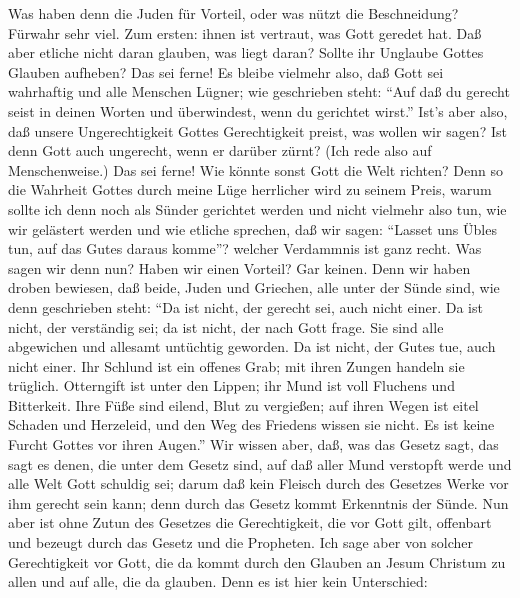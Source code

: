  Was haben denn die Juden für Vorteil, oder was nützt die
Beschneidung?  Fürwahr sehr viel. Zum ersten: ihnen ist
vertraut, was Gott geredet hat.  Daß aber etliche nicht
daran glauben, was liegt daran? Sollte ihr Unglaube Gottes Glauben
aufheben?  Das sei ferne! Es bleibe vielmehr also, daß Gott
sei wahrhaftig und alle Menschen Lügner; wie geschrieben steht: ``Auf
daß du gerecht seist in deinen Worten und überwindest, wenn du gerichtet
wirst.''  Ist's aber also, daß unsere Ungerechtigkeit Gottes
Gerechtigkeit preist, was wollen wir sagen? Ist denn Gott auch
ungerecht, wenn er darüber zürnt? (Ich rede also auf Menschenweise.)
 Das sei ferne! Wie könnte sonst Gott die Welt richten?
 Denn so die Wahrheit Gottes durch meine Lüge herrlicher
wird zu seinem Preis, warum sollte ich denn noch als Sünder gerichtet
werden  und nicht vielmehr also tun, wie wir gelästert
werden und wie etliche sprechen, daß wir sagen: ``Lasset uns Übles tun,
auf das Gutes daraus komme''? welcher Verdammnis ist ganz recht.
 Was sagen wir denn nun? Haben wir einen Vorteil? Gar
keinen. Denn wir haben droben bewiesen, daß beide, Juden und Griechen,
alle unter der Sünde sind,  wie denn geschrieben steht:
``Da ist nicht, der gerecht sei, auch nicht einer.  Da ist
nicht, der verständig sei; da ist nicht, der nach Gott frage.
 Sie sind alle abgewichen und allesamt untüchtig geworden.
Da ist nicht, der Gutes tue, auch nicht einer.  Ihr Schlund
ist ein offenes Grab; mit ihren Zungen handeln sie trüglich. Otterngift
ist unter den Lippen;  ihr Mund ist voll Fluchens und
Bitterkeit.  Ihre Füße sind eilend, Blut zu vergießen;
 auf ihren Wegen ist eitel Schaden und Herzeleid,
 und den Weg des Friedens wissen sie nicht. 
Es ist keine Furcht Gottes vor ihren Augen.''  Wir wissen
aber, daß, was das Gesetz sagt, das sagt es denen, die unter dem Gesetz
sind, auf daß aller Mund verstopft werde und alle Welt Gott schuldig
sei;  darum daß kein Fleisch durch des Gesetzes Werke vor
ihm gerecht sein kann; denn durch das Gesetz kommt Erkenntnis der Sünde.
 Nun aber ist ohne Zutun des Gesetzes die Gerechtigkeit,
die vor Gott gilt, offenbart und bezeugt durch das Gesetz und die
Propheten.  Ich sage aber von solcher Gerechtigkeit vor
Gott, die da kommt durch den Glauben an Jesum Christum zu allen und auf
alle, die da glauben.  Denn es ist hier kein Unterschied:

